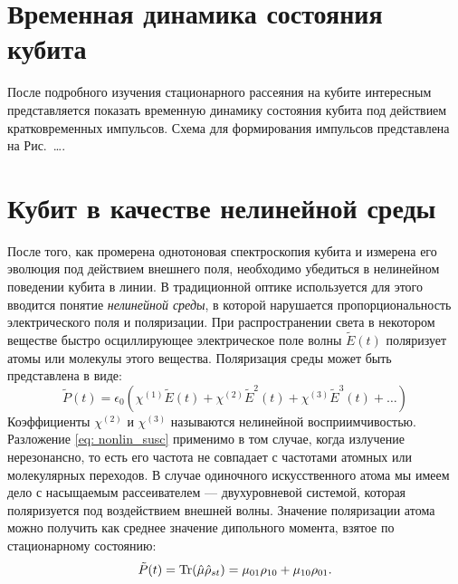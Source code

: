 \section{Временная динамика состояния кубита}
После подробного изучения стационарного рассеяния на кубите интересным представляется показать временную динамику состояния кубита под действием кратковременных импульсов. Схема для формирования импульсов представлена на Рис.~\ldots. 
\section{Кубит в качестве нелинейной среды}
После того, как промерена однотоновая спектроскопия кубита и измерена его эволюция под действием внешнего поля, необходимо убедиться в нелинейном поведении кубита в линии. В традиционной оптике используется для этого вводится понятие \textit{нелинейной среды}, в которой нарушается пропорциональность электрического поля и поляризации. При распространении света в некотором веществе быстро осциллирующее электрическое поле волны $\tilde{E}(t)$ поляризует атомы или молекулы этого вещества. Поляризация среды может быть представлена в виде:
\begin{equation}
\tilde{P}(t) = \epsilon_0\left(\chi^{(1)}\tilde{E}(t) + \chi^{(2)}\tilde{E}^2(t) + \chi^{(3)}\tilde{E}^3(t) + \ldots\right)
\label{eq: nonlin_susc}
\end{equation}
Коэффициенты $\chi^{(2)}$ и $\chi^{(3)}$ называются нелинейной восприимчивостью. Разложение \eqref{eq: nonlin_susc} применимо в том случае, когда излучение нерезонансно, то есть его частота не совпадает с частотами атомных или молекулярных переходов. В случае одиночного искусственного атома мы имеем дело с насыщаемым рассеивателем --- двухуровневой системой, которая поляризуется под воздействием внешней волны. Значение поляризации атома можно получить как среднее значение дипольного момента, взятое по стационарному состоянию:
\begin{equation}
\tilde{P}(t) = \operatorname{Tr}(\hat{\mu}\hat{\rho}_{st}) = \mu_{01}\rho_{10} + \mu_{10}\rho_{01}.
\end{equation}

